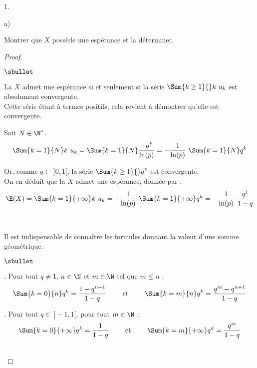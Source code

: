 \begin{noliste}{1.}
\item
  \begin{noliste}{a)}
    \setlength{\itemsep}{2mm}
  \item Montrer que $X$ possède une espérance et la déterminer.

    \begin{proof}~%
      \begin{noliste}{$\sbullet$}
      \item La \var $X$ admet une espérance si et seulement si la
        série $\Sum{k \geq 1}{} k \ u_k$ est absolument convergente.\\
        Cette série étant à termes positifs, cela revient à démontrer
        qu'elle est convergente.

      \item Soit $N \in \N^*$.
        \[
        \Sum{k = 1}{N} k \ u_k = \Sum{k = 1}{N} \dfrac{-q^k}{\ln(p)} =
        -\dfrac{1}{\ln(p)} \ \Sum{k = 1}{N} q^k
        \]

      \item Or, comme $q \in \ ]0, 1[$, la série $\Sum{k \geq 1}{}
        q^k$ est convergente.\\
        On en déduit que la \var $X$ admet une espérance, donnée par : 
        \[
        \E(X) = \Sum{k=1}{+\infty} k \ u_k = -\dfrac{1}{\ln(p)}
        \ \Sum{k=1}{+\infty} q^k = -\dfrac{1}{\ln(p)} \ \dfrac{q^1}{1-q}
        \]
      \end{noliste}
      ~\\[-1.1cm]
      \begin{remarkL}{.95}
        Il est indispensable de connaître les formules donnant la
        valeur d'une somme géométrique.
        \begin{noliste}{$\sbullet$}
        \item {}. Pour tout $q
          \neq 1$, $n \in \N$ et $m \in \N$ tel que $m \leq n$ :
          \[
          \Sum{k = 0}{n} q^k = \dfrac{1 - q^{n+1}}{1-q} %
          \qquad \text{ et } \qquad %
          \Sum{k = m}{n} q^k = \dfrac{q^m - q^{n+1}}{1-q}
          \]
          
        \item {}. Pour tout
          $q \in \ ]-1, 1[$, pour tout $m \in \N$ :
          \[
          \Sum{k = 0}{+\infty} q^k = \dfrac{1}{1-q}%
          \qquad \text{ et } \qquad %
          \Sum{k = m}{+\infty} q^k = \dfrac{q^m}{1-q}
          \]
        \end{noliste}
      \end{remarkL}~\\[-1.2cm]
    \end{proof}



\end{noliste}
\end{noliste}
